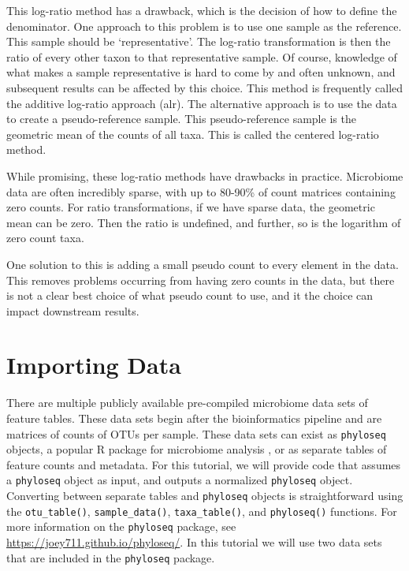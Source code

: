 \documentclass[
]{book}
\begin{document}
This log-ratio method has a drawback, which is the decision of how to define the denominator. One approach to this problem is to use one sample as the reference. This sample should be `representative'. The log-ratio transformation is then the ratio of every other taxon to that representative sample. Of course, knowledge of what makes a sample representative is hard to come by and often unknown, and subsequent results can be affected by this choice. This method is frequently called the additive log-ratio approach (alr). The alternative approach is to use the data to create a pseudo-reference sample. This pseudo-reference sample is the geometric mean of the counts of all taxa. This is called the centered log-ratio method.

While promising, these log-ratio methods have drawbacks in practice. Microbiome data are often incredibly sparse, with up to 80-90\% of count matrices containing zero counts. For ratio transformations, if we have sparse data, the geometric mean can be zero. Then the ratio is undefined, and further, so is the logarithm of zero count taxa.

One solution to this is adding a small pseudo count to every element in the data. This removes problems occurring from having zero counts in the data, but there is not a clear best choice of what pseudo count to use, and it the choice can impact downstream results.

\hypertarget{importing-data}{%
\chapter{Importing Data}\label{importing-data}}

There are multiple publicly available pre-compiled microbiome data sets of feature tables. These data sets begin after the bioinformatics pipeline and are matrices of counts of OTUs per sample. These data sets can exist as \texttt{phyloseq} objects, a popular R package for microbiome analysis \citep{mcmurdie2013}, or as separate tables of feature counts and metadata. For this tutorial, we will provide code that assumes a \texttt{phyloseq} object as input, and outputs a normalized \texttt{phyloseq} object. Converting between separate tables and \texttt{phyloseq} objects is straightforward using the \texttt{otu\_table()}, \texttt{sample\_data()}, \texttt{taxa\_table()}, and \texttt{phyloseq()} functions. For more information on the \texttt{phyloseq} package, see \url{https://joey711.github.io/phyloseq/}. In this tutorial we will use two data sets that are included in the \texttt{phyloseq} package.
\end{document}
